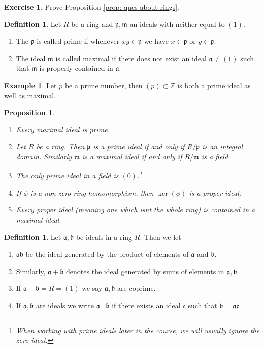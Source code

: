 \documentclass[11pt,a4paper]{report}
\theoremstyle{plain}
\newtheorem{prop}[subsection]{Proposition}
\theoremstyle{definition}
\newtheorem{defn}[subsection]{Definition}
\newtheorem{exmp}[subsection]{Example}
\theoremstyle{definition}
\newtheorem{question}[subsection]{Exercise}
\newcommand{\ZZ}{\mathbb{Z}}
\def\gothb{\mathfrak{b}}
\def\gothc{\mathfrak{c}}
\def\gothm{\mathfrak{m}}
\def\gothp{\mathfrak{p}}
\def\gotha{\mathfrak{a}}
\begin{document}
	\begin{question}
		Prove Proposition \ref{prop: ques about rings}.
	\end{question}
	
	\begin{defn}
		Let $R$ be a ring and $\gothp,\gothm$ an ideals with neither equal to  $(1)$. 
		\begin{enumerate}
			\item The $\gothp$ is called prime if whenever $xy \in \gothp$ we have $x \in \gothp$ or $y \in \gothp$.
			\item 	The ideal $\gothm$ is called maximal if there does not exist an ideal $\gotha \ne (1)$ such that $\gothm$ is properly contained in $\gotha$.
		\end{enumerate}
	\end{defn}
	
	\begin{exmp}
		Let $p$ be a prime number, then $(p) \subset \ZZ $ is both a prime ideal as well as maximal. 
	\end{exmp} 
	
	\begin{prop}\label{prop: prime and max ideals in rings}
		\begin{enumerate}
			\item Every maximal ideal is prime.
			\item Let $R$ be a ring. Then $\gothp$ is a prime ideal if and only if $R/\gothp$ is an integral domain. Similarly $\gothm$ is a maximal ideal if and only if $R/\gothm$ is a field.
			\item The only prime ideal in a field is $(0)$.\footnote{When working with prime ideals later in the course, we will usually ignore the zero ideal.}
			\item If $\phi$ is a non-zero ring homomorphism, then $\ker(\phi)$ is a proper ideal.
			\item Every proper ideal (meaning one which isnt the whole ring) is contained in a maximal ideal.
		\end{enumerate} 
	\end{prop}
	
	
	\begin{defn}
		Let $\gotha,\gothb$ be ideals in a ring $R$. Then we let 
		
		\begin{enumerate}
			\item $\gotha \gothb$ be the ideal generated by the product of elements of $\gotha$ and $\gothb$.
			\item Similarly, $\gotha+\gothb$ denotes the ideal generated by sums of elements in $\gotha,\gothb$.
			\item If $\gotha+\gothb=R=(1)$ we say $\gotha,\gothb$ are coprime.
			\item If $\gotha,\gothb$ are ideals we write $\gotha \mid \gothb$ if there exists an ideal $\gothc$ such that $\gothb=\gotha\gothc$.
			
		\end{enumerate}
	\end{defn}
	
\end{document}
